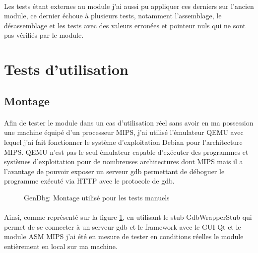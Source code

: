 \documentclass[11pt, book, english, french, standardlists]{upmethodology-document}
\begin{document}
				\paragraph*{}
					Les tests étant externes au module j'ai aussi pu appliquer ces derniers sur l'ancien module, ce dernier échoue à plusieurs tests, notamment l'assemblage, le désassemblage et les tests avec des valeurs erronées et pointeur nuls qui ne sont pas vérifiés par le module.
		\section{Tests d'utilisation}
			\subsection{Montage}
				\paragraph*{}
					Afin de tester le module dans un cas d'utilisation réel sans avoir en ma possession une machine équipé d'un processeur MIPS, j'ai utilisé l'émulateur QEMU avec lequel j'ai fait fonctionner le système d'exploitation Debian pour l'architecture MIPS. QEMU n'est pas le seul émulateur capable d'exécuter des programmes et systèmes d'exploitation pour de nombreuses architectures dont MIPS mais il a l'avantage de pouvoir exposer un serveur gdb permettant de déboguer le programme exécuté via \acrshort{HTTP} avec le protocole de gdb.
				\begin{figure}[H]
					\centering
					\caption{GenDbg: Montage utilisé pour les tests manuels}
					\label{fig:GenDbg_montage_test_manuels}
				\end{figure}
				\paragraph*{}
					Ainsi, comme représenté sur la figure \ref{fig:GenDbg_montage_test_manuels}, en utilisant le stub GdbWrapperStub qui permet de se connecter à un serveur gdb et le framework avec le \gls{GUI} Qt et le module ASM \gls{MIPS} j'ai été en mesure de tester en conditions réelles le module entièrement en local sur ma machine.
	\nocite{*}
	
	
	\printglossary[type=\acronymtype,title=Lexique,toctitle=Lexique]{}
		\setcounter{section}{0}
		\renewcommand{\thesection}{\Alph{section}}
		\renewcommand{\theHsection}{appendixsection.\Alph{section}}
\end{document}
